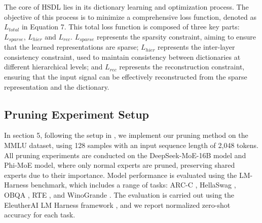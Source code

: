 \documentclass[11pt]{article}
\begin{document}
The core of HSDL lies in its dictionary learning and optimization process. The objective of this process is to minimize a comprehensive loss function, denoted as $L_{total}$ in Equation 7. This total loss function is composed of three key parts: $L_{sparse}$, $L_{hier}$ and $L_{rec}$. $L_{sparse}$ represents the sparsity constraint, aiming to ensure that the learned representations are sparse;  $L_{hier}$ represents the inter-layer consistency constraint, used to maintain consistency between dictionaries at different hierarchical levels; and $L_{rec}$ represents the reconstruction constraint, ensuring that the input signal can be effectively reconstructed from the sparse representation and the dictionary. 


\subsection{Pruning Experiment Setup}
In section 5, following the setup in \cite{he_demystifying_2024}, we implement our pruning method on the MMLU \cite{hendrycks2021measuring} dataset, using 128 samples with an input sequence length of 2,048 tokens. All pruning experiments are conducted on the DeepSeek-MoE-16B model and Phi-MoE model, where only normal experts are pruned, preserving shared experts due to their importance. Model performance is evaluated using the LM-Harness benchmark, which includes a range of tasks: ARC-C \cite{clark2018think},  HellaSwag \cite{zellers2019hellaswag}
, OBQA \cite{mihaylov2018suit},  RTE \cite{wang2019glue}, and WinoGrande \cite{ai2:winogrande}. The evaluation is carried out using the EleutherAI LM Harness framework \cite{eval-harness}, and we report normalized zero-shot accuracy for each task.
\end{document}

